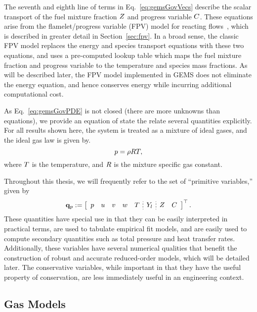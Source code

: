 The seventh and eighth line of terms in Eq.~\ref{eq:gemsGovVecs} describe the scalar transport of the fuel mixture fraction $Z$ and progress variable $C$. These equations arise from the flamelet/progress variable (FPV) model for reacting flows~\cite{Pierce2001}, which is described in greater detail in Section~\ref{sec:fpv}. In a broad sense, the classic FPV model replaces the energy and species transport equations with these two equations, and uses a pre-computed lookup table which maps the fuel mixture fraction and progress variable to the temperature and species mass fractions. As will be described later, the FPV model implemented in GEMS does not eliminate the energy equation, and hence conserves energy while incurring additional computational cost.

As Eq.~\ref{eq:gemsGovPDE} is not closed (there are more unknowns than equations), we provide an equation of state the relate several quantities explicitly. For all results shown here, the system is treated as a mixture of ideal gases, and the ideal gas law is given by.
%
\begin{equation}\label{eq:idealGas}
	p = \rho R T,
\end{equation}
%
where $T$ is the temperature, and $R$ is the mixture specific gas constant.

Throughout this thesis, we will frequently refer to the set of ``primitive variables,'' given by
%
\begin{equation}\label{eq:gemsPrimVec}
    \primVec \defEq \left[
    \begin{array}{ccccc;{2pt/2pt}c;{2pt/2pt}cc}
    \pressure & \velX & \velY & \velZ & \temperature & \mfSpec & \mixFrac & \progVar
    \end{array}
    \right]^\top.
\end{equation}
%
These quantities have special use in that they can be easily interpreted in practical terms, are used to tabulate empirical fit models, and are easily used to compute secondary quantities such as total pressure and heat transfer rates. Additionally, these variables have several numerical qualities that benefit the construction of robust and accurate reduced-order models, which will be detailed later. The conservative variables, while important in that they have the useful property of conservation, are less immediately useful in an engineering context.

\subsection{Gas Models}\label{subsec:gasModels}

